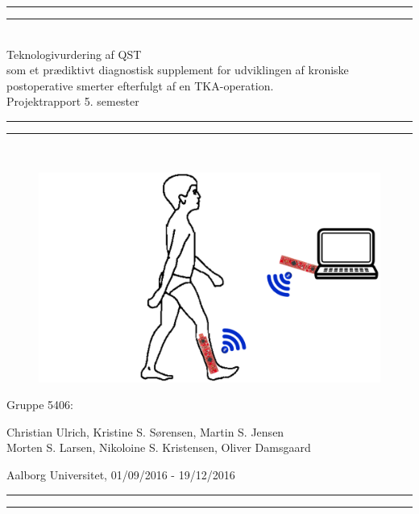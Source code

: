 \clearpage
\thispagestyle{empty}

\begin{center}
	\vspace*{\baselineskip}
	\rule{\textwidth}{1.6pt}\vspace*{-\baselineskip}\vspace*{2pt} %
	\rule{\textwidth}{0.4pt}\\[\baselineskip] %
	
	{\huge Teknologivurdering af QST \\\hspace*{2ex} som et prædiktivt diagnostisk supplement for udviklingen af kroniske postoperative smerter efterfulgt af en TKA-operation.\\[0.5\baselineskip] \large Projektrapport 5. semester}\\[0.2\baselineskip] %
	
	\rule{\textwidth}{0.4pt}\vspace*{-\baselineskip}\vspace{3.2pt} %
	\rule{\textwidth}{1.6pt}\\[\baselineskip] %
	\vspace*{5\baselineskip}
	\begin{figure}[H]
		\centering
		\begin{minipage}[c]{1\textwidth}
			\includegraphics[width=.65\textwidth]{figures/forside2.PNG}
		\end{minipage}
		\hfill
	\end{figure}
	\vspace*{\fill}
	\scshape %
	{\Large Gruppe 5406:\par}
	Christian Ulrich, Kristine S. Sørensen, Martin S. Jensen \\
	Morten S. Larsen, Nikoloine S. Kristensen, Oliver Damsgaard
	
	\vspace*{.2\baselineskip} %
	Aalborg Universitet,  01/09/2016 - 19/12/2016 \par %
\end{center} %
\begin{center}
	\rule{\textwidth}{0.4pt}\vspace*{-\baselineskip}\vspace{3.2pt} %
	\rule{\textwidth}{1.6pt}\\[\baselineskip] %
\end{center}